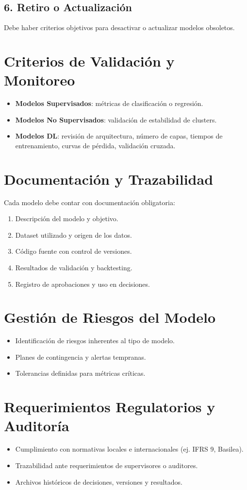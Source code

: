 \documentclass[12pt]{article}
\begin{document}
\subsection{6. Retiro o Actualización}
Debe haber criterios objetivos para desactivar o actualizar modelos obsoletos.

\section{Criterios de Validación y Monitoreo}
\begin{itemize}
  \item \textbf{Modelos Supervisados}: métricas de clasificación o regresión.
  \item \textbf{Modelos No Supervisados}: validación de estabilidad de clusters.
  \item \textbf{Modelos DL}: revisión de arquitectura, número de capas, tiempos de entrenamiento, curvas de pérdida, validación cruzada.
\end{itemize}

\section{Documentación y Trazabilidad}
Cada modelo debe contar con documentación obligatoria:
\begin{enumerate}
  \item Descripción del modelo y objetivo.
  \item Dataset utilizado y origen de los datos.
  \item Código fuente con control de versiones.
  \item Resultados de validación y backtesting.
  \item Registro de aprobaciones y uso en decisiones.
\end{enumerate}

\section{Gestión de Riesgos del Modelo}
\begin{itemize}
  \item Identificación de riesgos inherentes al tipo de modelo.
  \item Planes de contingencia y alertas tempranas.
  \item Tolerancias definidas para métricas críticas.
\end{itemize}

\section{Requerimientos Regulatorios y Auditoría}
\begin{itemize}
  \item Cumplimiento con normativas locales e internacionales (ej. IFRS 9, Basilea).
  \item Trazabilidad ante requerimientos de supervisores o auditores.
  \item Archivos históricos de decisiones, versiones y resultados.
\end{itemize}
\end{document}
